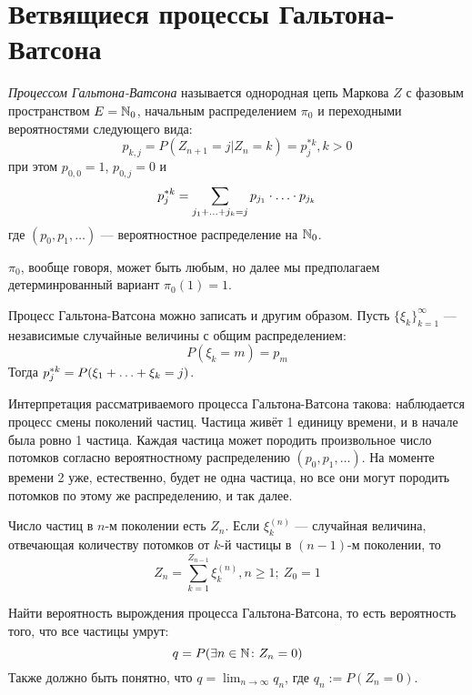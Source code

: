 \section{Ветвящиеся процессы Гальтона-Ватсона}

\begin{definition}
	\textit{Процессом Гальтона-Ватсона} называется однородная цепь Маркова $Z$ с фазовым пространством $E = \mathbb{N}_0$, начальным распределением $\pi_0$ и переходными вероятностями следующего вида:
	\[
		p_{k, j} = P(Z_{n + 1} = j | Z_n = k) = p_j^{*k}, k > 0
	\]
	 при этом $p_{0, 0} = 1$, $p_{0, j} = 0$ и
	 \[
	 	p_j^{*k} = \sum_{j_1 + \ldots + j_k = j} p_{j_1} \cdot \ldots \cdot p_{j_k}
	 \]
	 где $(p_0, p_1, \ldots)$ --- вероятностное распределение на $\mathbb{N}_0$.
\end{definition}

\begin{note}
	$\pi_0$, вообще говоря, может быть любым, но далее мы предполагаем детерминрованный вариант $\pi_0(1) = 1$.
\end{note}

\begin{note}
	Процесс Гальтона-Ватсона можно записать и другим образом. Пусть $\{\xi_k\}_{k = 1}^\infty$ --- независимые случайные величины с общим распределением:
	\[
		P(\xi_k = m) = p_m
	\]
	Тогда $p_j^{*k} = P(\xi_1 + \ldots + \xi_k = j)$.
\end{note}

\begin{note}
	Интерпретация рассматриваемого процесса Гальтона-Ватсона такова: наблюдается процесс смены поколений частиц. Частица живёт 1 единицу времени, и в начале была ровно 1 частица. Каждая частица может породить произвольное число потомков согласно вероятностному распределению $(p_0, p_1, \ldots)$. На моменте времени 2 уже, естественно, будет не одна частица, но все они могут породить потомков по этому же распределению, и так далее.
	
	Число частиц в $n$-м поколении есть $Z_n$. Если $\xi_k^{(n)}$ --- случайная величина, отвечающая количеству потомков от $k$-й частицы в $(n - 1)$-м поколении, то
	\[
		Z_n = \sum_{k = 1}^{Z_{n - 1}} \xi_k^{(n)}, n \ge 1;\ Z_0 = 1
	\]
\end{note}

\begin{problem}
	Найти вероятность вырождения процесса Гальтона-Ватсона, то есть вероятность того, что все частицы умрут:
	\[
		q = P(\exists n \in \mathbb{N} \colon Z_n = 0)
	\]
	Также должно быть понятно, что $q = \lim_{n \to \infty} q_n$, где $q_n := P(Z_n = 0)$.
\end{problem}

